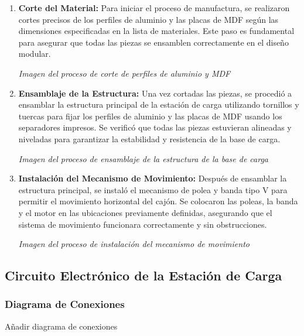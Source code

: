     \begin{enumerate}
        \item \textbf{Corte del Material:} Para iniciar el proceso de manufactura, se realizaron cortes precisos de los perfiles de aluminio y las placas de MDF según las dimensiones especificadas en la lista de materiales. Este paso es fundamental para asegurar que todas las piezas se ensamblen correctamente en el diseño modular.
            \begin{center}
                \textit{Imagen del proceso de corte de perfiles de aluminio y MDF}
            \end{center}
        \item \textbf{Ensamblaje de la Estructura:} Una vez cortadas las piezas, se procedió a ensamblar la estructura principal de la estación de carga utilizando tornillos y tuercas para fijar los perfiles de aluminio y las placas de MDF usando los separadores impresos. Se verificó que todas las piezas estuvieran alineadas y niveladas para garantizar la estabilidad y resistencia de la base de carga.
            \begin{center}
                \textit{Imagen del proceso de ensamblaje de la estructura de la base de carga}
            \end{center}
        \item \textbf{Instalación del Mecanismo de Movimiento:} Después de ensamblar la estructura principal, se instaló el mecanismo de polea y banda tipo V para permitir el movimiento horizontal del cajón. Se colocaron las poleas, la banda y el motor en las ubicaciones previamente definidas, asegurando que el sistema de movimiento funcionara correctamente y sin obstrucciones.
            \begin{center}
                \textit{Imagen del proceso de instalación del mecanismo de movimiento}
            \end{center}
        
    \end{enumerate}



\subsection{Circuito Electrónico de la Estación de Carga}

    \subsubsection{Diagrama de Conexiones}
    Añadir diagrama de conexiones

